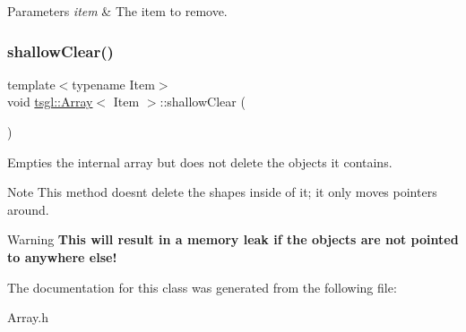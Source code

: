 \begin{DoxyParams}{Parameters}
{\em item} & The item to remove. \\
\hline
\end{DoxyParams}
\mbox{\label{classtsgl_1_1_array_afe9d7b1dd294e8c74280b961ac84ac10}} 
\subsubsection{\texorpdfstring{shallow\+Clear()}{shallowClear()}}
{\footnotesize\ttfamily template$<$typename Item$>$ \\
void \hyperlink{classtsgl_1_1_array}{tsgl\+::\+Array}$<$ Item $>$\+::shallow\+Clear (\begin{DoxyParamCaption}{ }\end{DoxyParamCaption})\hspace{0.3cm}{\ttfamily [inline]}}



Empties the internal array but does not delete the objects it contains. 

\begin{DoxyNote}{Note}
This method doesn\textquotesingle{}t delete the shapes inside of it; it only moves pointers around. 
\end{DoxyNote}
\begin{DoxyWarning}{Warning}
{\bfseries This will result in a memory leak if the objects are not pointed to anywhere else!} 
\end{DoxyWarning}


The documentation for this class was generated from the following file\+:\begin{DoxyCompactItemize}
\item 
Array.\+h\end{DoxyCompactItemize}

